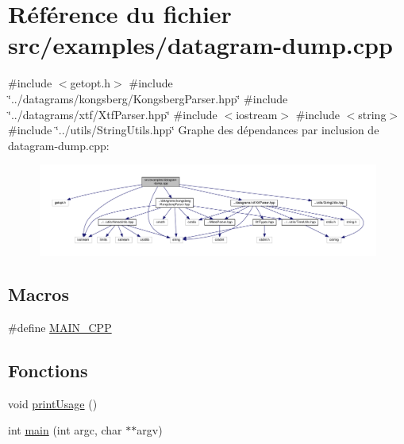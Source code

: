 \hypertarget{datagram-dump_8cpp}{}\section{Référence du fichier src/examples/datagram-\/dump.cpp}
\label{datagram-dump_8cpp}
{\ttfamily \#include $<$getopt.\+h$>$}\newline
{\ttfamily \#include \char`\"{}../datagrams/kongsberg/\+Kongsberg\+Parser.\+hpp\char`\"{}}\newline
{\ttfamily \#include \char`\"{}../datagrams/xtf/\+Xtf\+Parser.\+hpp\char`\"{}}\newline
{\ttfamily \#include $<$iostream$>$}\newline
{\ttfamily \#include $<$string$>$}\newline
{\ttfamily \#include \char`\"{}../utils/\+String\+Utils.\+hpp\char`\"{}}\newline
Graphe des dépendances par inclusion de datagram-\/dump.cpp\+:
\nopagebreak
\begin{figure}[H]
\begin{center}
\leavevmode
\includegraphics[width=350pt]{datagram-dump_8cpp__incl}
\end{center}
\end{figure}
\subsection*{Macros}
\begin{DoxyCompactItemize}
\item 
\#define \hyperlink{datagram-dump_8cpp_af6b0b7a8cf49a8aafda02b6d9c6085d6}{M\+A\+I\+N\+\_\+\+C\+PP}
\end{DoxyCompactItemize}
\subsection*{Fonctions}
\begin{DoxyCompactItemize}
\item 
void \hyperlink{datagram-dump_8cpp_aead97c99e70c0da7036fbbe230ef68b6}{print\+Usage} ()
\item 
int \hyperlink{datagram-dump_8cpp_a3c04138a5bfe5d72780bb7e82a18e627}{main} (int argc, char $\ast$$\ast$argv)
\end{DoxyCompactItemize}


